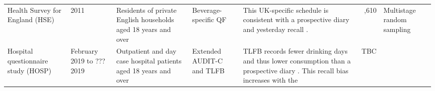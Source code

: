 \documentclass[]{article}
\begin{document}
\begin{longtable}[]{@{}lllllrl@{}}
\begin{minipage}[t]{0.12\columnwidth}
Health Survey for England (HSE) \citep{NatCenSocialResearch2013}\strut
\end{minipage} & \begin{minipage}[t]{0.12\columnwidth}\raggedright
2011\strut
\end{minipage} & \begin{minipage}[t]{0.12\columnwidth}\raggedright
Residents of private English households aged 18 years and over\strut
\end{minipage} & \begin{minipage}[t]{0.12\columnwidth}\raggedright
Beverage-specific QF\strut
\end{minipage} & \begin{minipage}[t]{0.12\columnwidth}\raggedright
This UK-specific schedule is consistent with a prospective diary
\citep{Boniface2014} and yesterday recall \citep{Stockwell2016}.\strut
\end{minipage} & \begin{minipage}[t]{0.07\columnwidth}\raggedleft
8,610\strut
\end{minipage} & \begin{minipage}[t]{0.12\columnwidth}\raggedright
Multistage random sampling\strut
\end{minipage}\tabularnewline
\begin{minipage}[t]{0.12\columnwidth}\raggedright
Hospital questionnaire study (HOSP)\strut
\end{minipage} & \begin{minipage}[t]{0.12\columnwidth}\raggedright
February 2019 to ??? 2019\strut
\end{minipage} & \begin{minipage}[t]{0.12\columnwidth}\raggedright
Outpatient and day case hospital patients aged 18 years and over\strut
\end{minipage} & \begin{minipage}[t]{0.12\columnwidth}\raggedright
Extended AUDIT-C and TLFB\strut
\end{minipage} & \begin{minipage}[t]{0.12\columnwidth}\raggedright
TLFB records fewer drinking days and thus lower consumption than a
prospective diary \citep{Grant1995}. This recall bias increases with the
\citep{Hoeppner2010, Vinson2003}\strut
\end{minipage} & \begin{minipage}[t]{0.07\columnwidth}\raggedleft
TBC\strut
\end{minipage} & \begin{minipage}[t]{0.12\columnwidth}\raggedright

\end{minipage}
\end{longtable}
\end{document}
